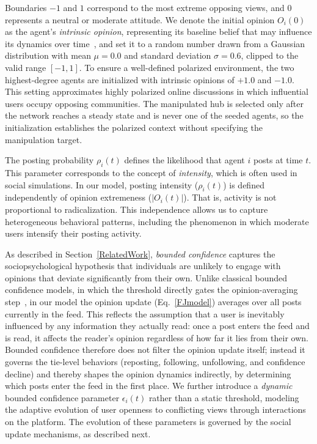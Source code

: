 \documentclass[pdflatex,sn-mathphys-num]{sn-jnl}%
\theoremstyle{thmstyleone}%
\theoremstyle{thmstyletwo}%
\theoremstyle{thmstylethree}%
\def\post{\rho} %
\def\BoundedConfidence{\epsilon}
\begin{document}
Boundaries $-1$ and $1$ correspond to the most extreme
opposing views, and $0$ represents a neutral or moderate
attitude. We denote the initial opinion $O_i(0)$ as
the agent's \emph{intrinsic opinion},
representing its baseline belief that may
influence its dynamics over time~\cite{Friedkin1990},
and set it to a random number drawn from a Gaussian
distribution with mean $\mu=0.0$ and standard deviation
$\sigma=0.6$, clipped to the valid range $[-1, 1]$.
To ensure a well-defined polarized environment, the two
highest-degree agents are initialized with intrinsic
opinions of $+1.0$ and $-1.0$.
This setting approximates highly polarized online discussions in which influential users occupy opposing communities.
The manipulated hub 
is selected only after the network reaches a steady state and 
is never one of the seeded agents, so the initialization establishes 
the polarized context without specifying the manipulation target.
\par


The posting probability $\post_i(t)$ defines the likelihood
that agent $i$ posts at time $t$. This parameter corresponds to the
concept of \emph{intensity}, which is often used in social simulations.
In our model, posting intensity ($\post_i(t)$) is
defined independently of opinion extremeness ($|O_i(t)|$). That is,
activity is not proportional to radicalization. This independence
allows us to capture heterogeneous behavioral patterns, including
the phenomenon in which moderate users intensify their posting activity.

As described in Section~\ref{RelatedWork}, \emph{bounded confidence} captures the sociopsychological hypothesis that
individuals are unlikely to engage with opinions that
deviate significantly from their own. Unlike classical bounded confidence
models, in which the threshold directly gates the opinion-averaging
step~\cite{Deffuant2000,Hegselmann2002}, in our model the opinion update
(Eq.~\eqref{FJmodel}) averages over all posts currently in the feed. This
reflects the assumption that a user is inevitably influenced by any information
they actually read: once a post enters the feed and is read, it affects the
reader's opinion regardless of how far it lies from their own. Bounded confidence
therefore does not filter the opinion update itself; instead it governs the
tie-level behaviors (reposting, following, unfollowing, and confidence
decline) and thereby shapes the opinion dynamics indirectly, by determining
which posts enter the feed in the first place. We further
introduce a \emph{dynamic} bounded confidence parameter $\BoundedConfidence_i(t)$
rather than a static threshold, modeling the adaptive evolution of user
openness to conflicting views through interactions on the platform.
The evolution of these parameters is
governed by the social update mechanisms, as described next.
\par
\end{document}
